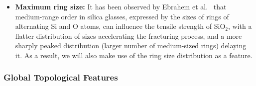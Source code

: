 \begin{itemize}
    
    
    \item\textbf{Maximum ring size:} It has been observed by Ebrahem et al.~\cite{ebrahem2018influence} that medium-range order in silica glasses, expressed by the sizes of rings of alternating Si and O atoms, can influence the tensile strength of SiO$_2$, with a flatter distribution of sizes accelerating the fracturing process, and a more sharply peaked distribution (larger number of medium-sized rings) delaying it. As a result, we will also make use of the ring size distribution as a feature.     
    
    
\end{itemize}

\subsubsection{Global Topological Features}

